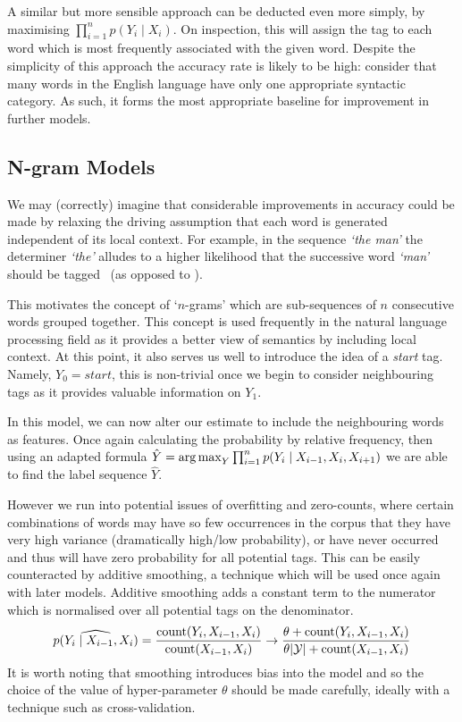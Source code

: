 \documentclass[../main.tex]{subfiles}
\begin{document}
A similar but more sensible approach can be deducted even more simply, by maximising $\prod_{i=1}^n p(Y_i \mid X_i)$.
On inspection, this will assign the tag to each word which is most frequently associated with the given word.
Despite the simplicity of this approach the accuracy rate is likely to be high: consider that many words in the English language have only one appropriate syntactic category.
As such, it forms the most appropriate baseline for improvement in further models.

\subsection{N-gram Models}

We may (correctly) imagine that considerable improvements in accuracy could be made by relaxing the driving assumption that each word is generated independent of its local context.
For example, in the sequence \textit{`the man'} the determiner \textit{`the'} alludes to a higher likelihood that the successive word \textit{`man'} should be tagged \noun\ (as opposed to \verbsym).

%We may take this as a contradiction of assumption \ref{ass:transition} and choose to exchange our assumption for one that states that $Y_i$ is dependent on one or more of its neighbouring elements.
This motivates the concept of `$n$-grams' which are sub-sequences of $n$ consecutive words grouped together.
This concept is used frequently in the natural language processing field as it provides a better view of semantics by including local context.
At this point, it also serves us well to introduce the idea of a \textit{start} tag. Namely, $Y_0 = \textit{start}$, this is non-trivial once we begin to consider neighbouring tags as it provides valuable information on $Y_1$.

In this model, we can now alter our estimate to include the neighbouring words as features.
Once again calculating the probability by relative frequency, then using an adapted formula $\hat{Y} = \operatorname*{arg\,max}_{Y} \prod_{i=1}^n  p(Y_i \mid X_{i-1}, X_i, X_{i+1})$ we are able to find the label sequence $\hat{Y}$. 

However we run into potential issues of overfitting and zero-counts, where certain combinations of words may have so few occurrences in the corpus that they have very high variance (dramatically high/low probability), or have never occurred and thus will have zero probability for all potential tags.
This can be easily counteracted by additive smoothing, a technique which will be used once again with later models.
Additive smoothing adds a constant term to the numerator which is normalised over all potential tags on the denominator.
\begin{equation*} \label{eq:bayes-smoothing}
\widehat{p(Y_i \mid X_{i-1}, X_{i})} = \frac{\operatorname{count} (Y_i, X_{i-1}, X_i)}{\operatorname{count} (X_{i-1}, X_i)}
\rightarrow
\frac{\theta + \operatorname{count} (Y_i, X_{i-1}, X_i)}{\theta |\mathcal{Y}| + \operatorname{count} (X_{i-1}, X_i)}
\end{equation*}
It is worth noting that smoothing introduces bias into the model and so the choice of the value of hyper-parameter $\theta$ should be made carefully, ideally with a technique such as cross-validation. 
\end{document}
